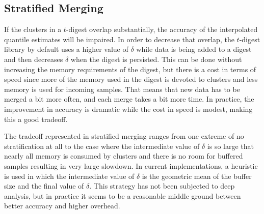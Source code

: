 \documentclass{vldb}
\begin{document}
\subsection{Stratified Merging}
If the clusters in a $t$-digest overlap substantially, the accuracy of the interpolated quantile estimates will be  impaired. In order to decrease that overlap, the $t$-digest library by default uses a higher value of $\delta$ while data is being added to a digest and then decreases $\delta$ when the digest is persisted. This can be done without increasing the memory requirements of the digest, but there is a cost in terms of speed since more of the memory used in the digest is devoted to clusters and less memory is used for incoming samples. That means that new data has to be merged a bit more often, and each merge takes a bit more time. In practice, the improvement in accuracy is dramatic while the cost in speed is modest, making this a good tradeoff.

The tradeoff represented in stratified merging ranges from one extreme of no stratification at all to the case where the intermediate value of $\delta$ is so large that nearly all memory is consumed by clusters and there is no room for buffered samples resulting in very large slowdown. In current implementations, a heuristic is used in which the intermediate value of $\delta$ is the geometric mean of the buffer size and the final value of $\delta$. This strategy has not been subjected to deep analysis, but  in practice it seems to be a reasonable middle ground between better accuracy and higher overhead.
\end{document}
